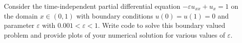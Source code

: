 \begin{problem}
    Consider the time-independent partial differential equation $-\varepsilon u_{xx} +
    u_x = 1$ on the domain $x \in (0,1)$ with boundary conditions $u(0) = u(1) = 0$ and
    parameter $\varepsilon$ with $0.001<\varepsilon<1$.
    Write code to solve this boundary valued problem and provide plots of your numerical
    solution for various values of $\varepsilon$. 
\end{problem}
